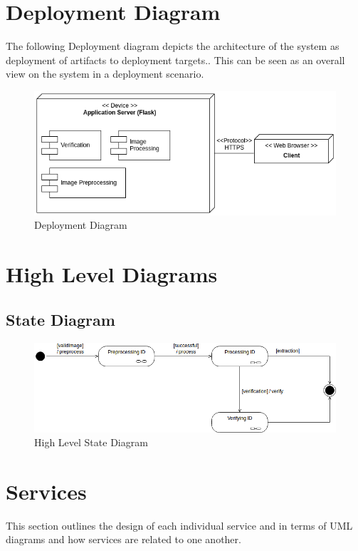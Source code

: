 \documentclass{article}
\begin{document}
\section{Deployment Diagram}
The following Deployment diagram depicts the architecture of the system as deployment of artifacts to deployment targets.. This can be seen as an overall view on the system in a deployment scenario.
\begin{figure}[h]
	    	\centering
	    	\includegraphics[scale=0.5]{img/Quant.png}
	    	\caption{Deployment Diagram}
	    \end{figure}
	    \pagebreak

\section{High Level Diagrams}

\subsection{State Diagram}
\begin{figure}[h]
	\centering
	\includegraphics[scale=0.5]{img/StateModelHighLevel.png}
	\caption{High Level State Diagram}
\end{figure}
	 
\section{Services}
This section outlines the design of each individual service and in terms of UML diagrams and how services are related to one another.
\end{document}
